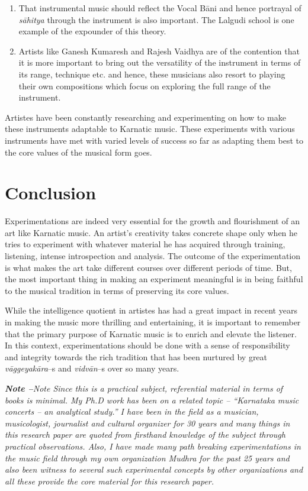 \begin{enumerate}
\item That instrumental music should reflect the Vocal Bāni and hence portrayal of \textit{sāhitya} through the instrument is also important. The Lalgudi school is one example of the expounder of this theory.

 \item Artists like Ganesh Kumaresh and Rajesh Vaidhya are of the contention that it is more important to bring out the versatility of the instrument in terms of its range, technique etc. and hence, these musicians also resort to playing their own compositions which focus on exploring the full range of the instrument.

\end{enumerate}

Artistes have been constantly researching and experimenting on how to make these instruments adaptable to Karnatic music. These experiments with various instruments have met with varied levels of success so far as adapting them best to the core values of the musical form goes.


\section*{Conclusion}

Experimentations are indeed very essential for the growth and flourishment of an art like Karnatic music. An artist’s creativity takes concrete shape only when he tries to experiment with whatever material he has acquired through training, listening, intense introspection and analysis. The outcome of the experimentation is what makes the art take different courses over different periods of time. But, the most important thing in making an experiment meaningful is in being faithful to the musical tradition in terms of preserving its core values.

While the intelligence quotient in artistes has had a great impact in recent years in making the music more thrilling and entertaining, it is important to remember that the primary purpose of Karnatic music is to enrich and elevate the listener. In this context, experimentations should be done with a sense of responsibility and integrity towards the rich tradition that has been nurtured by great \textit{vāggeyakāra}–s and \textit{vidvān}–s over so many years.

\textit{\textbf{Note –}Note Since this is a practical subject, referential material in terms of books is minimal. My Ph.D work has been on a related topic – “Karnataka music concerts – an analytical study.” I have been in the field as a musician, musicologist, journalist and cultural organizer for 30 years and many things in this research paper are quoted from firsthand knowledge of the subject through practical observations. Also, I have made many path breaking experimentations in the music field through my own organization Mudhra for the past 25 years and also been witness to several such experimental concepts by other organizations and all these provide the core material for this research paper.}


